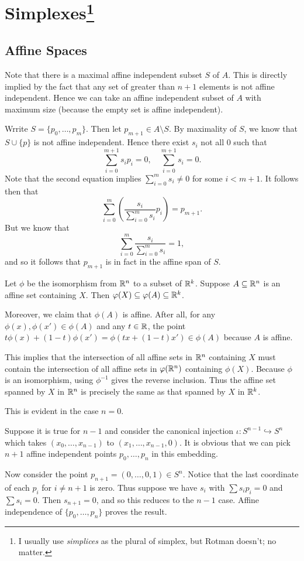 \documentclass[../solutions.tex]{subfiles}
\begin{document}
\section[Simplexes]{Simplexes\footnote{I usually use \emph{simplices} as the plural of simplex, but Rotman doesn't; no matter.}}
\subsection{Affine Spaces}
\begin{exercise} \leavevmode
Note that there is a maximal affine independent subset $S$ of $A$. This is directly implied by the fact that any set of greater than $n+1$ elements is not affine independent. Hence we can take an affine independent subset of $A$ with maximum size (because the empty set is affine independent). 

Wrrite $S=\{p_0,\dots,p_m\}$. Then let $p_{m+1}\in A\setminus S$. By maximality of $S$, we know that $S\cup\{p\}$ is not affine independent. Hence there exist $s_i$ not all 0 such that \[\sum_{i=0}^{m+1}s_ip_i=0,\quad\sum_{i=0}^{m+1}s_i=0.\] Note that the second equation implies $\sum_{i=0}^ms_i\ne0$ for some $i<m+1$. It follows then that \[\sum_{i=0}^m\left(\frac{s_i}{\sum_{i=0}^ms_i}p_i\right)=p_{m+1}.\] But we know that \[\sum_{i=0}^m\frac{s_i}{\sum_{i=0}^ms_i}=1,\] and so it follows that $p_{m+1}$ is in fact in the affine span of $S$. 
\end{exercise} 

\begin{exercise} \leavevmode
Let $\phi$ be the isomorphism from $\mathbb{R}^n$ to a subset of $\mathbb{R}^k$. Suppose $A\subseteq\mathbb{R}^n$ is an affine set containing $X$. Then $\varphi(X)\subseteq\varphi(A)\subseteq\mathbb{R}^k$. 

Moreover, we claim that $\phi(A)$ is affine. After all, for any $\phi(x),\phi(x')\in\phi(A)$ and any $t\in\mathbb{R}$, the point $t\phi(x)+(1-t)\phi(x')=\phi(tx+(1-t)x')\in\phi(A)$ because $A$ is affine. 

This implies that the intersection of all affine sets in $\mathbb{R}^n$ containing $X$ must contain the intersection of all affine sets in $\varphi(\mathbb{R}^n)$ containing $\phi(X)$. Because $\phi$ is an isomorphism, using $\phi^{-1}$ gives the reverse inclusion. Thus the affine set spanned by $X$ in $\mathbb{R}^n$ is precisely the same as that spanned by $X$ in $\mathbb{R}^k$. 
\end{exercise} 

\begin{exercise} \leavevmode
This is evident in the case $n=0$. 

Suppose it is true for $n-1$ and consider the canonical injection $\iota:S^{n-1}\hookrightarrow S^n$ which takes $(x_0,\dots,x_{n-1})$ to $(x_1,\dots,x_{n-1},0)$. It is obvious that we can pick $n+1$ affine independent points $p_0,\dots,p_n$ in this embedding. 

Now consider the point $p_{n+1}=(0,\dots,0,1)\in S^n$. Notice that the last coordinate of each $p_i$ for $i\ne n+1$ is zero. Thus suppose we have $s_i$ with $\sum s_ip_i=0$ and $\sum s_i=0$. Then $s_{n+1}=0$, and so this reduces to the $n-1$ case. Affine independence of $\{p_0,\dots,p_n\}$ proves the result. 
\end{exercise} 
\end{document}
